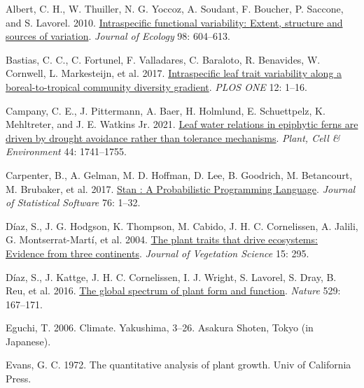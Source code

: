 \documentclass[
  12pt,
  a4paper,
,tablecaptionabove
]{scrartcl}
\newlength{\cslhangindent}
\newenvironment{CSLReferences}[2] %
 {%
  \setlength{\parindent}{0pt}
  \ifodd #1 \everypar{\setlength{\hangindent}{\cslhangindent}}\ignorespaces\fi
  \ifnum #2 > 0
  \setlength{\parskip}{#2\baselineskip}
  \fi
 }%
 {}
\begin{document}
\hypertarget{refs}{}
\begin{CSLReferences}{1}{0}
\leavevmode{}%
Albert, C. H., W. Thuiller, N. G. Yoccoz, A. Soudant, F. Boucher, P. Saccone, and S. Lavorel. 2010. \href{https://doi.org/10.1111/j.1365-2745.2010.01651.x}{Intraspecific functional variability: {Extent}, structure and sources of variation}. \emph{Journal of Ecology} 98: 604--613.

\leavevmode{}%
Bastias, C. C., C. Fortunel, F. Valladares, C. Baraloto, R. Benavides, W. Cornwell, L. Markesteijn, et al. 2017. \href{https://doi.org/10.1371/journal.pone.0172495}{Intraspecific leaf trait variability along a boreal-to-tropical community diversity gradient}. \emph{PLOS ONE} 12: 1--16.

\leavevmode{}%
Campany, C. E., J. Pittermann, A. Baer, H. Holmlund, E. Schuettpelz, K. Mehltreter, and J. E. Watkins Jr. 2021. \href{https://doi.org/10.1111/pce.14042}{Leaf water relations in epiphytic ferns are driven by drought avoidance rather than tolerance mechanisms}. \emph{Plant, Cell \& Environment} 44: 1741--1755.

\leavevmode{}%
Carpenter, B., A. Gelman, M. D. Hoffman, D. Lee, B. Goodrich, M. Betancourt, M. Brubaker, et al. 2017. \href{https://doi.org/10.18637/jss.v076.i01}{Stan : {A Probabilistic Programming Language}}. \emph{Journal of Statistical Software} 76: 1--32.

\leavevmode{}%
Díaz, S., J. G. Hodgson, K. Thompson, M. Cabido, J. H. C. Cornelissen, A. Jalili, G. Montserrat-Martí, et al. 2004. \href{https://doi.org/10.1658/1100-9233(2004)015\%5B0295:TPTTDE\%5D2.0.CO;2}{The plant traits that drive ecosystems: {Evidence} from three continents}. \emph{Journal of Vegetation Science} 15: 295.

\leavevmode{}%
Díaz, S., J. Kattge, J. H. C. Cornelissen, I. J. Wright, S. Lavorel, S. Dray, B. Reu, et al. 2016. \href{https://doi.org/10.1038/nature16489}{The global spectrum of plant form and function}. \emph{Nature} 529: 167--171.

\leavevmode{}%
Eguchi, T. 2006. Climate. Yakushima, 3--26. {Asakura Shoten}, {Tokyo (in Japanese)}.

\leavevmode{}%
Evans, G. C. 1972. The quantitative analysis of plant growth. {Univ of California Press}.


\end{CSLReferences}
\end{document}
